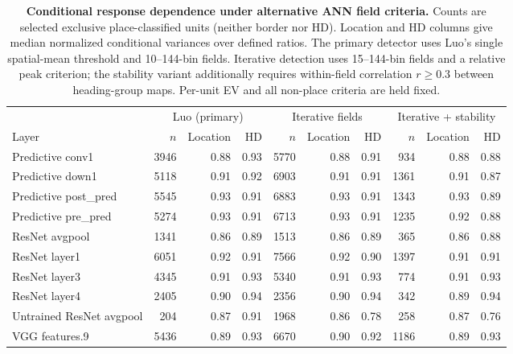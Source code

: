 \begin{table}[htbp]
\centering\footnotesize\setlength{\tabcolsep}{3pt}
\begin{tabular}{lrrrrrrrrr}
\hline
 & \multicolumn{3}{c}{Luo (primary)} & \multicolumn{3}{c}{Iterative fields} & \multicolumn{3}{c}{Iterative + stability} \\
Layer & $n$ & Location & HD & $n$ & Location & HD & $n$ & Location & HD \\\hline
Predictive conv1 & 3946 & 0.88 & 0.93 & 5770 & 0.88 & 0.91 & 934 & 0.88 & 0.88 \\
Predictive down1 & 5118 & 0.91 & 0.92 & 6903 & 0.91 & 0.91 & 1361 & 0.91 & 0.87 \\
Predictive post\_pred & 5545 & 0.93 & 0.91 & 6883 & 0.93 & 0.91 & 1343 & 0.93 & 0.89 \\
Predictive pre\_pred & 5274 & 0.93 & 0.91 & 6713 & 0.93 & 0.91 & 1235 & 0.92 & 0.88 \\
ResNet avgpool & 1341 & 0.86 & 0.89 & 1513 & 0.86 & 0.89 & 365 & 0.86 & 0.88 \\
ResNet layer1 & 6051 & 0.92 & 0.91 & 7566 & 0.92 & 0.90 & 1397 & 0.91 & 0.91 \\
ResNet layer3 & 4345 & 0.91 & 0.93 & 5340 & 0.91 & 0.93 & 774 & 0.91 & 0.93 \\
ResNet layer4 & 2405 & 0.90 & 0.94 & 2356 & 0.90 & 0.94 & 342 & 0.89 & 0.94 \\
Untrained ResNet avgpool & 204 & 0.87 & 0.91 & 1968 & 0.86 & 0.78 & 258 & 0.87 & 0.76 \\
VGG features.9 & 5436 & 0.89 & 0.93 & 6670 & 0.90 & 0.92 & 1186 & 0.89 & 0.93 \\
\hline
\end{tabular}
\caption{\textbf{Conditional response dependence under alternative ANN field criteria.} Counts are selected exclusive place-classified units (neither border nor HD). Location and HD columns give median normalized conditional variances over defined ratios. The primary detector uses Luo's single spatial-mean threshold and 10--144-bin fields. Iterative detection uses 15--144-bin fields and a relative peak criterion; the stability variant additionally requires within-field correlation $r\geq0.3$ between heading-group maps. Per-unit EV and all non-place criteria are held fixed.}
\label{tab:ann_stability}
\end{table}
